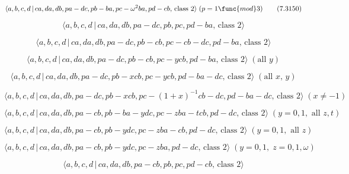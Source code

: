 \documentclass[10pt]{article}
\begin{document}
\begin{equation}
\langle a,b,c,d\,|\,ca,da,db,pa-dc,pb-ba,pc-\omega ^{2}ba,pd-cb,\,\text{%
class }2\rangle \;(p=1\func{mod}3)  \tag{7.3150}
\end{equation}

\begin{equation}
\langle a,b,c,d\,|\,ca,da,db,pa-dc,pb,pc,pd-ba,\,\text{class }2\rangle 
\tag{7.3151}
\end{equation}

\begin{equation}
\langle a,b,c,d\,|\,ca,da,db,pa-dc,pb-cb,pc-cb-dc,pd-ba,\,\text{class }%
2\rangle  \tag{7.3152}
\end{equation}

\begin{equation}
\langle a,b,c,d\,|\,ca,da,db,pa-dc,pb-cb,pc-ycb,pd-ba,\,\text{class }%
2\rangle \;(\text{all }y)  \tag{7.3153}
\end{equation}

\begin{equation}
\langle a,b,c,d\,|\,ca,da,db,pa-dc,pb-xcb,pc-ycb,pd-ba-dc,\,\text{class }%
2\rangle \;(\text{all }x,\,y)  \tag{7.3154}
\end{equation}

\begin{equation}
\langle a,b,c,d\,|\,ca,da,db,pa-dc,pb-xcb,pc-(1+x)^{-1}cb-dc,pd-ba-dc,\,%
\text{class }2\rangle \;(x\neq -1)  \tag{7.3155}
\end{equation}

\begin{equation}
\langle a,b,c,d\,|\,ca,da,db,pa-cb,pb-ba-ydc,pc-zba-tcb,pd-dc,\,\text{class }%
2\rangle \;(y=0,1,\text{ all }z,t)  \tag{7.3156}
\end{equation}

\begin{equation}
\langle a,b,c,d\,|\,ca,da,db,pa-cb,pb-ydc,pc-zba-cb,pd-dc,\,\text{class }%
2\rangle \;(y=0,1,\text{ all }z)  \tag{7.3157}
\end{equation}

\begin{equation}
\langle a,b,c,d\,|\,ca,da,db,pa-cb,pb-ydc,pc-zba,pd-dc,\,\text{class }%
2\rangle \;(y=0,1,\;z=0,1,\omega )  \tag{7.3158}
\end{equation}

\begin{equation}
\langle a,b,c,d\,|\,ca,da,db,pa-cb,pb,pc,pd-cb,\,\text{class }2\rangle 
\tag{7.3159}
\end{equation}
\end{document}
